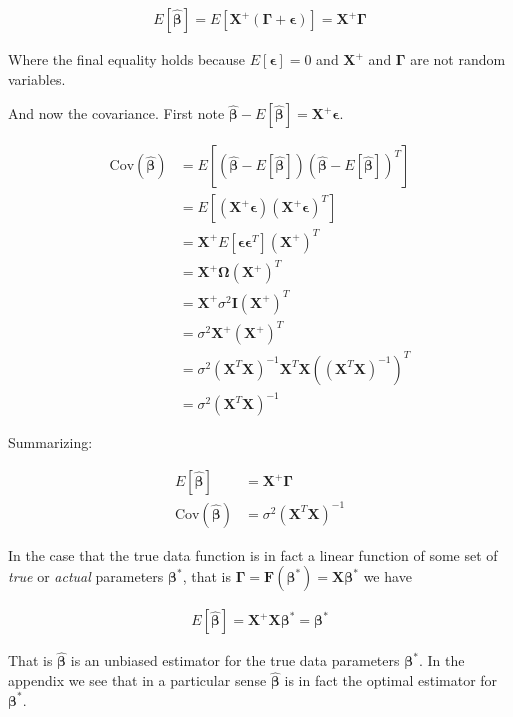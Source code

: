 \documentclass[12pt]{article}
\newcommand{\ep}{\epsilon}
\newcommand{\bv}[1]{\boldsymbol{#1}}
\begin{document}
\begin{align}
E\left[\bv{\hat{\beta}} \right] = E\left[\bv{X}^+ (\bv{\Gamma} + \bv{\ep})\right] = \bv{X}^+ \bv{\Gamma}
\end{align}

Where the final equality holds because $E[\bv{\ep}]=0$ and $\bv{X}^+$ and $\bv{\Gamma}$ are not random variables.

And now the covariance. First note $\bv{\hat{\beta}} - E\left[\bv{\hat{\beta}}\right] = \bv{X}^+\bv{\ep}$.

\begin{align}
\text{Cov}\left(\bv{\hat{\beta}}\right) &= E\left[\left(\bv{\hat{\beta}} - E\left[\bv{\hat{\beta}}\right] \right)\left(\bv{\hat{\beta}} - E\left[\bv{\hat{\beta}}\right] \right)^T \right]\\
&= E\left[(\bv{X}^+ \bv{\ep})(\bv{X}^+ \bv{\ep})^T\right]\\
&= \bv{X}^+ E[\bv{\ep}\bv{\ep}^T](\bv{X}^+)^T\\
&= \bv{X}^+ \bv{\Omega} (\bv{X}^+)^T\\
&= \bv{X}^+\sigma^2 \bv{I} (\bv{X}^+)^T\\
&= \sigma^2 \bv{X}^+ (\bv{X}^+)^T\\
&= \sigma^2 (\bv{X}^T\bv{X})^{-1}\bv{X}^T \bv{X} \left((\bv{X}^T\bv{X})^{-1}\right)^T\\
&= \sigma^2 \left(\bv{X}^T\bv{X}\right)^{-1}
\end{align}

Summarizing:

\begin{align}
E\left[\bv{\hat{\beta}}\right] &= \bv{X}^+\bv{\Gamma}\\
\text{Cov}\left(\bv{\hat{\beta}}\right) &= \sigma^2\left(\bv{X}^T\bv{X}\right)^{-1}
\end{align}

In the case that the true data function is in fact a linear function of some set of \textit{true} or \textit{actual} parameters $\bv{\beta^*}$, that is $\bv{\Gamma} = \bv{F}(\bv{\beta^*}) = \bv{X}\bv{\beta^*}$ we have

\begin{align}
E\left[\bv{\hat{\beta}}\right] = \bv{X}^+\bv{X}\bv{\beta^*} = \bv{\beta^*}
\end{align}

That is $\bv{\hat{\beta}}$ is an unbiased estimator for the true data parameters $\bv{\beta^*}$. In the appendix we see that in a particular sense $\bv{\hat{\beta}}$ is in fact the optimal estimator for $\bv{\beta^*}$.
\end{document}
